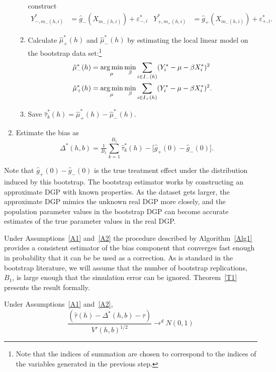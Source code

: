 \documentclass[12pt,fleqn]{article}
\begin{document}
\begin{algorithm}
\begin{enumerate}
\begin{enumerate}
      construct
      \begin{align*}
        Y_{-,m_-(h,i)}^* &= \hat g_-(X_{m_-(h,i)}) + \varepsilon_{-,i}^{*} &
        Y_{+,m_+(h,i)}^* &= \hat g_+(X_{m_-(h,i)}) + \varepsilon_{+,i}^{*}.
      \end{align*}
    \item Calculate $\hat\mu_+^*(h)$ and $\hat\mu_-^*(h)$ by estimating the
      local linear model on the bootstrap data set:\footnote{%
        Note that the indices of summation are chosen to correspond to the
        indices of the variables generated in the previous step.} %
      \begin{align*}
        \hat\mu_-^*(h)
        &= \argmin_{\mu} \min_{\beta} \ssum[-]{i}{h}
          (Y_i^* - \mu - \beta X_i^*)^2 \\
        \hat\mu_+^*(h)
        &= \argmin_{\mu} \min_{\beta} \ssum[+]{i}{h}
          (Y_i^* - \mu - \beta X_i^*)^2.
      \end{align*}
    \item Save $\hat\tau^*_k(h) = \hat\mu_+^*(h) - \hat\mu_-^*(h)$.
    \end{enumerate}
  \item Estimate the bias as
    \begin{equation*}
      \Delta^*(h,b) = \tfrac{1}{B_1} \sum_{k=1}^{B_1} \hat\tau^*_k(h) -
      \big[\hat g_+(0) - \hat g_-(0)\big].
    \end{equation*}
  \end{enumerate}
\end{algorithm}
Note that $\hat g_+(0) - \hat g_-(0)$ is the true treatment effect under the
distribution induced by this bootstrap. The bootstrap estimator works by
constructing an approximate DGP with known properties. As the dataset gets
larger, the approximate DGP mimics the unknown real DGP more closely, and the
population parameter values in the bootstrap DGP can become accurate estimates
of the true parameter values in the real DGP.

Under Assumptions~\ref{A1} and~\ref{A2} the procedure described by
Algorithm~\ref{Alg1} provides a consistent estimator of the bias component that
converges fast enough in probability that it can be be used as a correction. As
is standard in the bootstrap literature, we will assume that the number of
bootstrap replications, $B_{1}$, is large enough that the simulation error can
be ignored. Theorem~\ref{T1} presents the result formally.

\begin{theorem}\label{T1}
  Under Assumptions~\ref{A1} and~\ref{A2},
\begin{equation}
  \label{eq:4}
  \frac{(\hat\tau(h) - \Delta^{*}(h,b) - \tau)}{ V'(h, b)^{1/2}}
  \to^{d} N(0,1)
\end{equation}
\end{theorem}
\end{document}
